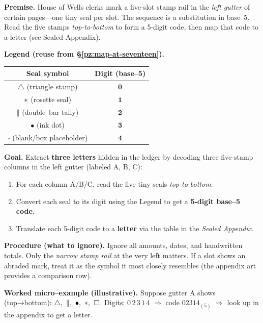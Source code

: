 \documentclass[11pt]{article}
\begin{document}
\begin{itemize}
\medskip
\noindent\textbf{Premise.} House of Wells clerks mark a five-slot stamp rail in the \emph{left gutter} of certain pages—one tiny seal per slot. The sequence is a substitution in base–5. Read the five stamps \emph{top-to-bottom} to form a 5-digit code, then map that code to a letter (see Sealed Appendix).

\medskip
\noindent\textbf{Legend (reuse from \S\ref{pz:map-at-seventeen}).}
\begin{center}
\begin{tabular}{c|c}
\textbf{Seal symbol} & \textbf{Digit (base–5)} \\
\hline
\(\triangle\) (triangle stamp) & \(\mathbf{0}\) \\
\(\large\ast\) (rosette seal) & \(\mathbf{1}\) \\
\(\Vert\) (double–bar tally) & \(\mathbf{2}\) \\
\(\bullet\) (ink dot) & \(\mathbf{3}\) \\
\(\square\) (blank/box placeholder) & \(\mathbf{4}\) \\
\end{tabular}
\end{center}

\medskip
\noindent\textbf{Goal.} Extract \textbf{three letters} hidden in the ledger by decoding three five-stamp columns in the left gutter (labeled \textsc{A}, \textsc{B}, \textsc{C}):

\begin{enumerate}\setlength\itemsep{0.25em}
  \item For each column \textsc{A}/\textsc{B}/\textsc{C}, read the five tiny seals \emph{top-to-bottom}.
  \item Convert each seal to its digit using the Legend to get a \textbf{5-digit base–5 code}.
  \item Translate each 5-digit code to a \textbf{letter} via the table in the \emph{Sealed Appendix}.
\end{enumerate}

\medskip
\noindent\textbf{Procedure (what to ignore).} Ignore all amounts, dates, and handwritten totals. Only the \emph{narrow stamp rail} at the very left matters. If a slot shows an abraded mark, treat it as the symbol it most closely resembles (the appendix art provides a comparison row).

\medskip
\noindent\textbf{Worked micro–example (illustrative).}  
Suppose gutter \textsc{A} shows (top→bottom): \(\triangle,\ \Vert,\ \bullet,\ \large\ast,\ \square\).  
Digits: \(0\,2\,3\,1\,4\) \(\Rightarrow\) code \(02314_{(5)}\) \(\Rightarrow\) look up in the appendix to get a letter.


\end{itemize}
\end{document}

